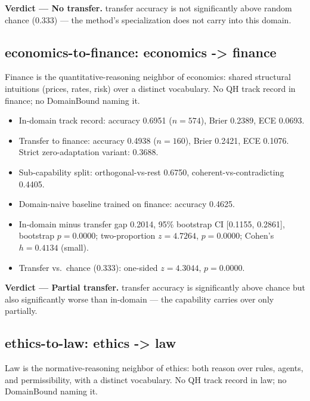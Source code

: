 \documentclass[11pt]{article}
\begin{document}
\noindent\textbf{Verdict --- No transfer.} transfer accuracy is not significantly above random chance (0.333) --- the method's specialization does not carry into this domain.

\subsection{economics-to-finance: economics -> finance}

Finance is the quantitative-reasoning neighbor of economics: shared structural intuitions (prices, rates, risk) over a distinct vocabulary. No QH track record in finance; no DomainBound naming it.

\begin{itemize}

\item In-domain track record: accuracy 0.6951 ($n=574$), Brier 0.2389, ECE 0.0693.

\item Transfer to finance: accuracy 0.4938 ($n=160$), Brier 0.2421, ECE 0.1076. Strict zero-adaptation variant: 0.3688.

\item Sub-capability split: orthogonal-vs-rest 0.6750, coherent-vs-contradicting 0.4405.

\item Domain-naive baseline trained on finance: accuracy 0.4625.

\item In-domain minus transfer gap 0.2014, 95\% bootstrap CI [0.1155, 0.2861], bootstrap $p=0.0000$; two-proportion $z=4.7264$, $p=0.0000$; Cohen's $h=0.4134$ (small).

\item Transfer vs.\ chance (0.333): one-sided $z=4.3044$, $p=0.0000$.

\end{itemize}

\noindent\textbf{Verdict --- Partial transfer.} transfer accuracy is significantly above chance but also significantly worse than in-domain --- the capability carries over only partially.

\subsection{ethics-to-law: ethics -> law}

Law is the normative-reasoning neighbor of ethics: both reason over rules, agents, and permissibility, with a distinct vocabulary. No QH track record in law; no DomainBound naming it.
\end{document}
